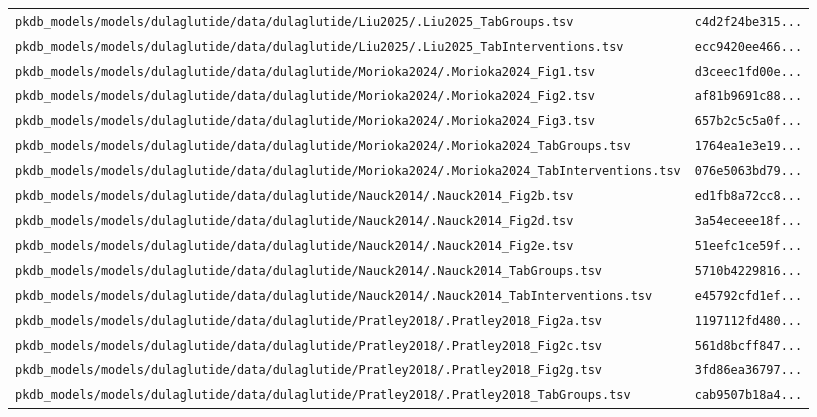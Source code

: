 \begin{longtable}{ll}
\texttt{pkdb\_models/models/dulaglutide/data/dulaglutide/Liu2025/.Liu2025\_TabGroups.tsv} & \texttt{c4d2f24be315...} \\
\texttt{pkdb\_models/models/dulaglutide/data/dulaglutide/Liu2025/.Liu2025\_TabInterventions.tsv} & \texttt{ecc9420ee466...} \\
\texttt{pkdb\_models/models/dulaglutide/data/dulaglutide/Morioka2024/.Morioka2024\_Fig1.tsv} & \texttt{d3ceec1fd00e...} \\
\texttt{pkdb\_models/models/dulaglutide/data/dulaglutide/Morioka2024/.Morioka2024\_Fig2.tsv} & \texttt{af81b9691c88...} \\
\texttt{pkdb\_models/models/dulaglutide/data/dulaglutide/Morioka2024/.Morioka2024\_Fig3.tsv} & \texttt{657b2c5c5a0f...} \\
\texttt{pkdb\_models/models/dulaglutide/data/dulaglutide/Morioka2024/.Morioka2024\_TabGroups.tsv} & \texttt{1764ea1e3e19...} \\
\texttt{pkdb\_models/models/dulaglutide/data/dulaglutide/Morioka2024/.Morioka2024\_TabInterventions.tsv} & \texttt{076e5063bd79...} \\
\texttt{pkdb\_models/models/dulaglutide/data/dulaglutide/Nauck2014/.Nauck2014\_Fig2b.tsv} & \texttt{ed1fb8a72cc8...} \\
\texttt{pkdb\_models/models/dulaglutide/data/dulaglutide/Nauck2014/.Nauck2014\_Fig2d.tsv} & \texttt{3a54eceee18f...} \\
\texttt{pkdb\_models/models/dulaglutide/data/dulaglutide/Nauck2014/.Nauck2014\_Fig2e.tsv} & \texttt{51eefc1ce59f...} \\
\texttt{pkdb\_models/models/dulaglutide/data/dulaglutide/Nauck2014/.Nauck2014\_TabGroups.tsv} & \texttt{5710b4229816...} \\
\texttt{pkdb\_models/models/dulaglutide/data/dulaglutide/Nauck2014/.Nauck2014\_TabInterventions.tsv} & \texttt{e45792cfd1ef...} \\
\texttt{pkdb\_models/models/dulaglutide/data/dulaglutide/Pratley2018/.Pratley2018\_Fig2a.tsv} & \texttt{1197112fd480...} \\
\texttt{pkdb\_models/models/dulaglutide/data/dulaglutide/Pratley2018/.Pratley2018\_Fig2c.tsv} & \texttt{561d8bcff847...} \\
\texttt{pkdb\_models/models/dulaglutide/data/dulaglutide/Pratley2018/.Pratley2018\_Fig2g.tsv} & \texttt{3fd86ea36797...} \\
\texttt{pkdb\_models/models/dulaglutide/data/dulaglutide/Pratley2018/.Pratley2018\_TabGroups.tsv} & \texttt{cab9507b18a4...} \\

\end{longtable}
